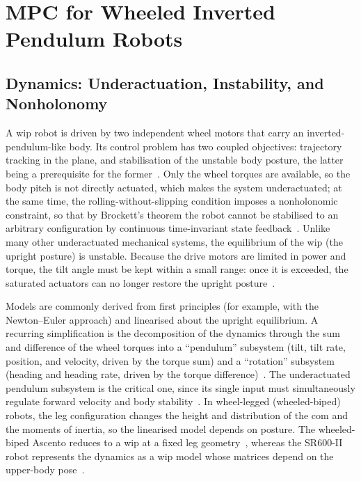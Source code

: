 \section{MPC for Wheeled Inverted Pendulum Robots}\label{sec:bg-wip}

\subsection{Dynamics: Underactuation, Instability, and Nonholonomy}\label{sec:bg-wip-dynamics}

A \ac{wip} robot is driven by two independent wheel motors that carry an inverted-pendulum-like body. Its control problem has two coupled objectives: trajectory tracking in the plane, and stabilisation of the unstable body posture, the latter being a prerequisite for the former~\cite{yue2018tsmc}. Only the wheel torques are available, so the body pitch is not directly actuated, which makes the system underactuated; at the same time, the rolling-without-slipping condition imposes a nonholonomic constraint, so that by Brockett's theorem the robot cannot be stabilised to an arbitrary configuration by continuous time-invariant state feedback~\cite{yue2018ijcas}. Unlike many other underactuated mechanical systems, the equilibrium of the \ac{wip} (the upright posture) is unstable. Because the drive motors are limited in power and torque, the tilt angle must be kept within a small range: once it is exceeded, the saturated actuators can no longer restore the upright posture~\cite{yue2018tsmc}.

Models are commonly derived from first principles (for example, with the Newton--Euler approach) and linearised about the upright equilibrium. A recurring simplification is the decomposition of the dynamics through the sum and difference of the wheel torques into a ``pendulum'' subsystem (tilt, tilt rate, position, and velocity, driven by the torque sum) and a ``rotation'' subsystem (heading and heading rate, driven by the torque difference)~\cite{minouchehr2015,yue2018tsmc}. The underactuated pendulum subsystem is the critical one, since its single input must simultaneously regulate forward velocity and body stability~\cite{yue2018tsmc}. In wheel-legged (wheeled-biped) robots, the leg configuration changes the height and distribution of the \ac{com} and the moments of inertia, so the linearised model depends on posture. The wheeled-biped Ascento reduces to a \ac{wip} at a fixed leg geometry~\cite{klemm2019}, whereas the SR600-II robot represents the dynamics as a \ac{wip} model whose matrices depend on the upper-body pose~\cite{zhang2022}.

